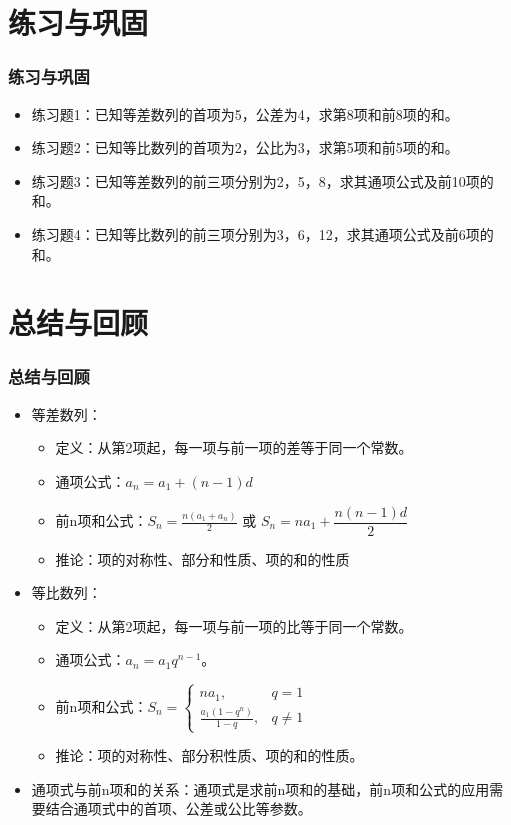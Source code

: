 \documentclass{ctexbeamer}
\begin{document}
\section{练习与巩固}
\begin{frame}[t]
\frametitle{练习与巩固}
\begin{itemize}
    \item 练习题1：已知等差数列的首项为5，公差为4，求第8项和前8项的和。
    \item 练习题2：已知等比数列的首项为2，公比为3，求第5项和前5项的和。
    \item 练习题3：已知等差数列的前三项分别为2，5，8，求其通项公式及前10项的和。
    \item 练习题4：已知等比数列的前三项分别为3，6，12，求其通项公式及前6项的和。
\end{itemize}
\end{frame}

\section{总结与回顾}
\begin{frame}[t]
\frametitle{总结与回顾}
\begin{itemize}
    \item 等差数列：
        \begin{itemize}
            \item 定义：从第2项起，每一项与前一项的差等于同一个常数。
            \item 通项公式：$a_n = a_1 + (n - 1)d$
            \item 前n项和公式：$S_n = \frac{n(a_1 + a_n)}{2}$ 或 $S_n = na_1 + \dfrac{n(n - 1)d}{2}$
            \item 推论：项的对称性、部分和性质、项的和的性质
        \end{itemize}
    \item 等比数列：
        \begin{itemize}
            \item 定义：从第2项起，每一项与前一项的比等于同一个常数。
            \item 通项公式：$a_n = a_1q^{n-1}$。
            \item 前n项和公式：$S_n = \begin{cases}
                na_1, & q = 1 \\
                \frac{a_1(1 - q^n)}{1 - q}, & q \neq 1
            \end{cases}$
            \item 推论：项的对称性、部分积性质、项的和的性质。
        \end{itemize}
    \item 通项式与前n项和的关系：通项式是求前n项和的基础，前n项和公式的应用需要结合通项式中的首项、公差或公比等参数。
\end{itemize}
\end{frame}
\end{document}
